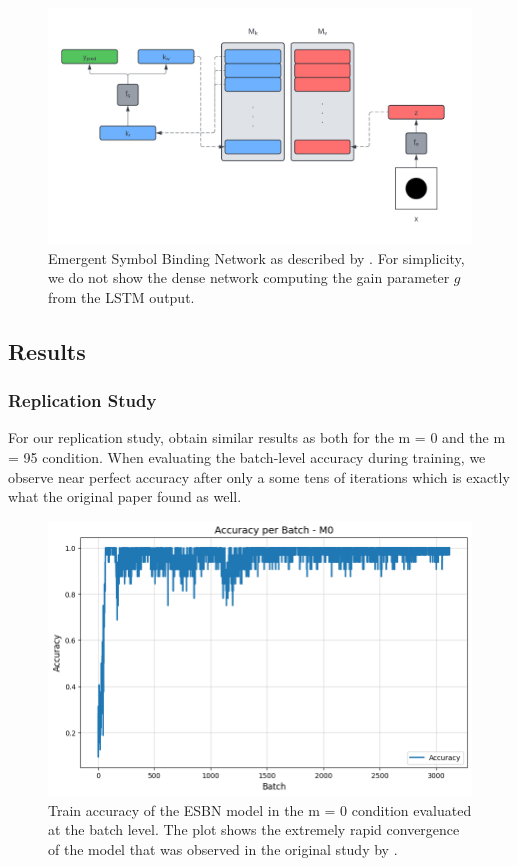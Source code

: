 \begin{figure}
    \centering
    \includegraphics[width=1.0\linewidth]{images/ESBN_Model.png}
    \caption{Emergent Symbol Binding Network as described by \textcite{webb_emergent_2021}. For simplicity, we do not show the dense network computing the gain parameter \(g\) from the LSTM output.}
    \label{fig:esbn_model}
\end{figure}


\subsection{Results}
\subsubsection{Replication Study}
For our replication study, obtain similar results as \textcite{webb_emergent_2021} both for the m = 0 and the m = 95 condition. When evaluating the batch-level accuracy during training, we observe near perfect accuracy after only a some tens of iterations which is exactly what the original paper found as well.

\begin{figure}
    \centering
    \includegraphics[width=0.6\linewidth]{images/acc_batchlvl_m0.png}
    \caption{Train accuracy of the ESBN model in the m = 0 condition evaluated at the batch level. The plot shows the extremely rapid convergence of the model that was observed in the original study by \textcite{webb_emergent_2021}.}
    \label{fig:acc_batchlvl_m0}
\end{figure}

